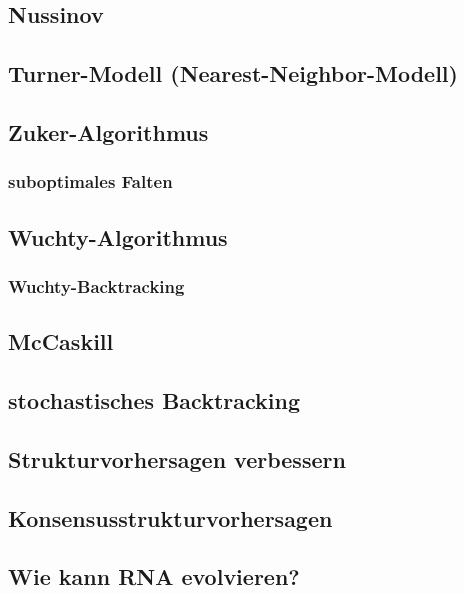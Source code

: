 \documentclass[12pt]{article}
\begin{document}
\subsection{Nussinov}

\subsection{Turner-Modell (Nearest-Neighbor-Modell)}

\subsection{Zuker-Algorithmus}

\subsubsection{suboptimales Falten}

\subsection{Wuchty-Algorithmus}

\subsubsection{Wuchty-Backtracking}

\subsection{McCaskill}

\subsection{stochastisches Backtracking}

\subsection{Strukturvorhersagen verbessern}

\subsection{Konsensusstrukturvorhersagen}

\subsection{Wie kann RNA evolvieren?}
\end{document}
